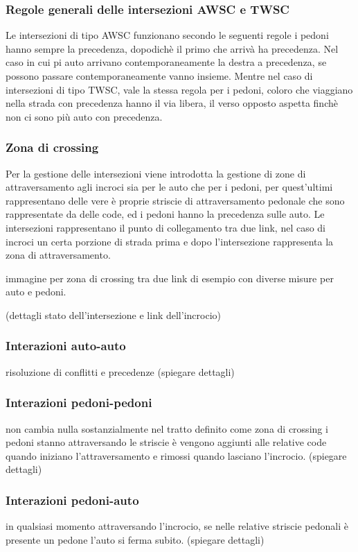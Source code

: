 \subsubsection{Regole generali delle intersezioni AWSC e TWSC} 
Le intersezioni di tipo AWSC funzionano secondo le seguenti regole i pedoni hanno sempre la precedenza, dopodichè il primo che arrivà ha precedenza.
Nel caso in cui pi auto arrivano contemporaneamente la destra a precedenza, se possono passare contemporaneamente vanno insieme.
Mentre nel caso di intersezioni di tipo TWSC, vale la stessa regola per i pedoni, coloro che viaggiano nella strada con precedenza hanno il via libera,
il verso opposto aspetta finchè non ci sono più auto con precedenza.

\subsubsection{Zona di crossing}
Per la gestione delle intersezioni viene introdotta la gestione di zone di attraversamento agli incroci sia per le auto 
che per i pedoni,  per quest'ultimi rappresentano delle vere è proprie striscie di attraversamento pedonale che sono rappresentate
da delle code, ed i pedoni hanno la precedenza sulle auto.
Le intersezioni rappresentano il punto di collegamento tra due link,
nel caso di incroci un certa porzione di strada prima e dopo l'intersezione rappresenta la zona di attraversamento.

\noindent
immagine per zona di crossing tra due link di esempio con diverse misure per auto e pedoni.

\noindent
(dettagli stato dell'intersezione e link dell'incrocio)


\subsubsection{Interazioni auto-auto}
risoluzione di conflitti e precedenze (spiegare dettagli)


\subsubsection{Interazioni pedoni-pedoni}
non cambia nulla sostanzialmente nel tratto definito come zona di crossing i pedoni stanno attraversando
le striscie è vengono aggiunti alle relative code quando iniziano l'attraversamento e rimossi quando lasciano l'incrocio. (spiegare dettagli)


\subsubsection{Interazioni pedoni-auto}
in qualsiasi momento attraversando l'incrocio,
se nelle relative striscie pedonali è presente un pedone l'auto si ferma subito. (spiegare dettagli)
